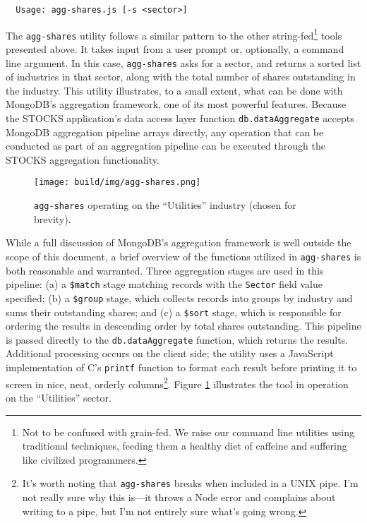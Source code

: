 \documentclass[
11pt,
titlepage,
]{article}
\begin{document}
\begin{lstlisting}
  Usage: agg-shares.js [-s <sector>]
\end{lstlisting}

The \texttt{agg-shares} utility follows a similar pattern to the other
string-fed\footnote{Not to be confused with grain-fed. We raise our command line
utilities using traditional techniques, feeding them a healthy diet of caffeine
and suffering like civilized programmers.} tools presented above. It takes input
from a user prompt or, optionally, a command line argument. In this case,
\texttt{agg-shares} asks for a sector, and returns a sorted list of industries
in that sector, along with the total number of shares outstanding in the
industry. This utility illustrates, to a small extent, what can be done with
MongoDB's aggregation framework, one of its most powerful features. Because the
STOCKS application's data access layer function \texttt{db.dataAggregate}
accepts MongoDB aggregation pipeline arrays directly, any operation that can be
conducted as part of an aggregation pipeline can be executed through the STOCKS
aggregation functionality.

\begin{figure}[bp]
  \texttt{[image: build/img/agg-shares.png]}
  \caption{\texttt{agg-shares} operating on the ``Utilities'' industry (chosen
    for brevity).}
  \label{fig:agg-shares}
\end{figure}

While a full discussion of MongoDB's aggregation framework is well outside the
scope of this document, a brief overview of the functions utilized in
\texttt{agg-shares} is both reasonable and warranted. Three aggregation stages
are used in this pipeline: (a) a \texttt{\$match} stage matching records
with the \texttt{Sector} field value specified; (b) a \texttt{\$group} stage,
which collects records into groups by industry and sums their outstanding
shares; and (c) a \texttt{\$sort} stage, which is responsible for ordering the
results in descending order by total shares outstanding. This pipeline is passed
directly to the \texttt{db.dataAggregate} function, which returns the results.
Additional processing occurs on the client side; the utility uses a JavaScript
implementation of C's \texttt{printf} function to format each result before
printing it to screen in nice, neat, orderly columns\footnote{It's worth noting
  that \texttt{agg-shares} breaks when included in a UNIX pipe. I'm not really
  sure why this is---it throws a Node error and complains about writing to a
  pipe, but I'm not entirely sure what's going wrong.}. Figure
\ref{fig:agg-shares} illustrates the tool in operation on the ``Utilities''
sector.
\end{document}
